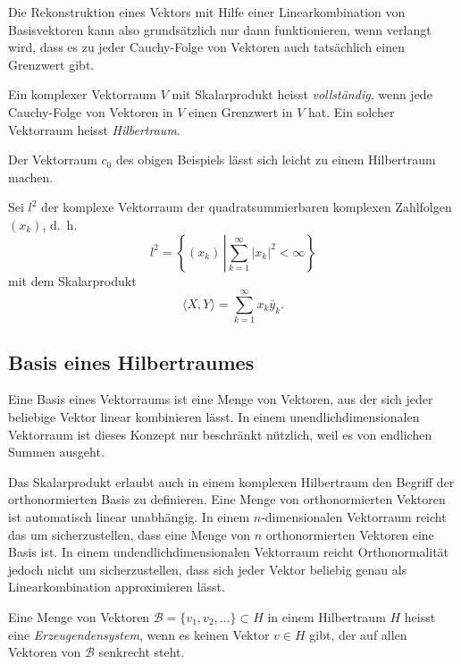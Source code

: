 Die Rekonstruktion eines Vektors mit Hilfe einer Linearkombination von
Basisvektoren kann also grundsätzlich nur dann funktionieren, wenn verlangt
wird, dass es zu jeder Cauchy-Folge von Vektoren auch tatsächlich einen
Grenzwert gibt.

\begin{definition}
Ein komplexer Vektorraum $V$ mit Skalarprodukt heisst {\em vollständig}, 
wenn jede Cauchy-Folge von Vektoren in $V$ einen Grenzwert in $V$ hat.
Ein solcher Vektorraum heisst {\em Hilbertraum}.
\end{definition}

Der Vektorraum $c_0$ des obigen Beispiels lässt sich leicht zu einem
Hilbertraum machen.

\begin{beispiel}
Sei $l^2$ der komplexe Vektorraum der quadratsummierbaren komplexen
Zahlfolgen $(x_k)$, d.~h.
\[
l^2 = \left\{ (x_k)\,\left| \sum_{k=1}^\infty |x_k|^2 < \infty \right.\right\}
\]
mit dem Skalarprodukt
\[
\langle X,Y\rangle = \sum_{k=1}^\infty x_k\bar{y}_k.
\]
\end{beispiel}

\subsection{Basis eines Hilbertraumes
\label{subsection:hilbertraum-basis}}
Eine Basis eines Vektorraums ist eine Menge von Vektoren, aus der sich
jeder beliebige Vektor linear kombinieren lässt.
In einem unendlichdimensionalen Vektorraum ist dieses Konzept nur
beschränkt nützlich, weil es von endlichen Summen ausgeht.

Das Skalarprodukt erlaubt auch in einem komplexen Hilbertraum den Begriff
der orthonormierten Basis zu definieren.
Eine Menge von orthonormierten Vektoren ist automatisch linear unabhängig.
In einem $n$-dimensionalen Vektorraum reicht das um sicherzustellen,
dass eine Menge von $n$ orthonormierten Vektoren eine Basis ist.
In einem undendlichdimensionalen Vektorraum reicht Orthonormalität
jedoch nicht um sicherzustellen, dass sich jeder Vektor beliebig genau
als Linearkombination approximieren lässt.

\begin{definition}
Eine Menge von Vektoren $\mathcal{B} = \{v_1,v_2,\dots\}\subset H$ in einem
Hilbertraum $H$ heisst eine {\em Erzeugendensystem}, wenn es keinen Vektor
$v\in H$ gibt, der auf allen Vektoren von $\mathcal{B}$ senkrecht steht.
\end{definition}

